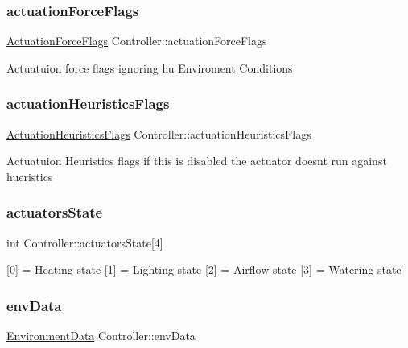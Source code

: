 \subsubsection{\texorpdfstring{actuation\+Force\+Flags}{actuationForceFlags}}
{\footnotesize\ttfamily \hyperlink{structActuationForceFlags}{Actuation\+Force\+Flags} Controller\+::actuation\+Force\+Flags}

Actuatuion force flags ignoring hu Enviroment Conditions \mbox{\label{classController_ae3d5121f2fa076d362ac5d56feae17d2}} 
\subsubsection{\texorpdfstring{actuation\+Heuristics\+Flags}{actuationHeuristicsFlags}}
{\footnotesize\ttfamily \hyperlink{structActuationHeuristicsFlags}{Actuation\+Heuristics\+Flags} Controller\+::actuation\+Heuristics\+Flags}

Actuatuion Heuristics flags if this is disabled the actuator doesn\textquotesingle{}t run against hueristics \mbox{\label{classController_a23064d241b70e672c4c1d3db9671bd5e}} 
\subsubsection{\texorpdfstring{actuators\+State}{actuatorsState}}
{\footnotesize\ttfamily int Controller\+::actuators\+State\mbox{[}4\mbox{]}}

\mbox{[}0\mbox{]} = Heating state \mbox{[}1\mbox{]} = Lighting state \mbox{[}2\mbox{]} = Airflow state \mbox{[}3\mbox{]} = Watering state \mbox{\label{classController_ac99088334f56588243867ca1c18f9633}} 
\subsubsection{\texorpdfstring{env\+Data}{envData}}
{\footnotesize\ttfamily \hyperlink{structEnvironmentData}{Environment\+Data} Controller\+::env\+Data}

